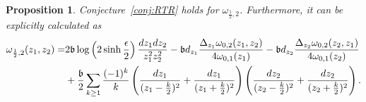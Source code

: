 \documentclass[12pt]{amsart}
\theoremstyle{plain}
\newtheorem{proposition}[theorem]{Proposition}
\theoremstyle{definition}
\theoremstyle{remark}
\numberwithin{equation}{section}
\begin{document}
\begin{proposition}\label{prop:1/2,2}
Conjecture~\ref{conj:RTR} holds for $\omega_{\frac12,2}$. Furthermore, it can be explicitly calculated as
\begin{align}
\omega_{\frac12,2}(z_1,z_2)=&2\mathfrak{b}\log\left(2\sinh\frac{\epsilon}{2}\right)\frac{dz_1dz_2}{z_1^2z_2^2}-\mathfrak{b}d_{z_1}\frac{\Delta_{z_1}\omega_{0,2}(z_1,z_2)}{4\omega_{0,1}(z_1)}-\mathfrak{b}d_{z_2}\frac{\Delta_{z_2}\omega_{0,2}(z_2,z_1)}{4\omega_{0,1}(z_2)}\nonumber\\
&+\frac{\mathfrak{b}}{2}\sum_{k\geq1}\frac{(-1)^k}{k}\left(\frac{dz_1}{(z_1-\frac{k}{2})^2}+\frac{dz_1}{(z_1+\frac{k}{2})^2}\right)\left(\frac{dz_2}{(z_2-\frac{k}{2})^2}+\frac{dz_2}{(z_2+\frac{k}{2})^2}\right)\label{explicit w_{1/2,2}}.
\end{align}
\end{proposition}
\end{document}
